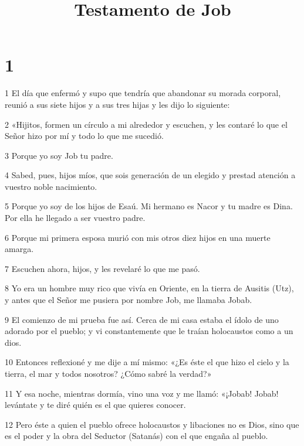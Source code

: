 


\title{Testamento de Job}

\chapter{1}

\par 1 El día que enfermó y supo que tendría que abandonar su morada corporal, reunió a sus siete hijos y a sus tres hijas y les dijo lo siguiente:

\par 2 «Hijitos, formen un círculo a mi alrededor y escuchen, y les contaré lo que el Señor hizo por mí y todo lo que me sucedió.

\par 3 Porque yo soy Job tu padre.

\par 4 Sabed, pues, hijos míos, que sois generación de un elegido y prestad atención a vuestro noble nacimiento.

\par 5 Porque yo soy de los hijos de Esaú. Mi hermano es Nacor y tu madre es Dina. Por ella he llegado a ser vuestro padre.

\par 6 Porque mi primera esposa murió con mis otros diez hijos en una muerte amarga.

\par 7 Escuchen ahora, hijos, y les revelaré lo que me pasó.

\par 8 Yo era un hombre muy rico que vivía en Oriente, en la tierra de Ausitis (Utz), y antes que el Señor me pusiera por nombre Job, me llamaba Jobab.

\par 9 El comienzo de mi prueba fue así. Cerca de mi casa estaba el ídolo de uno adorado por el pueblo; y vi constantemente que le traían holocaustos como a un dios.

\par 10 Entonces reflexioné y me dije a mí mismo: «¿Es éste el que hizo el cielo y la tierra, el mar y todos nosotros? ¿Cómo sabré la verdad?»

\par 11 Y esa noche, mientras dormía, vino una voz y me llamó: «¡Jobab! Jobab! levántate y te diré quién es el que quieres conocer.

\par 12 Pero éste a quien el pueblo ofrece holocaustos y libaciones no es Dios, sino que es el poder y la obra del Seductor (Satanás) con el que engaña al pueblo.

